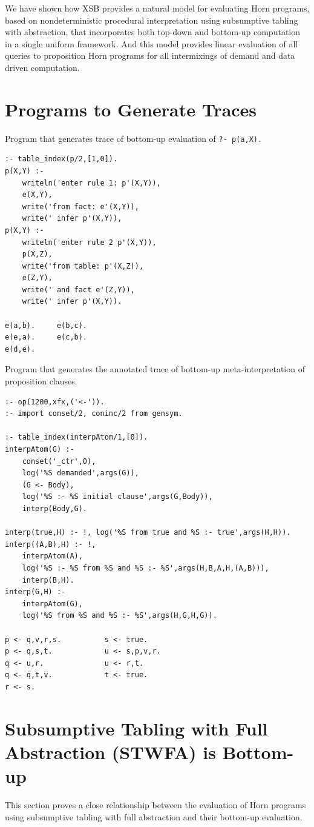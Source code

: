 We have shown how XSB provides a natural model for evaluating Horn
programs, based on nondeterministic procedural interpretation using
subsumptive tabling with abstraction, that incorporates both top-down
and bottom-up computation in a single uniform framework.  And this
model provides linear evaluation of all queries to proposition Horn
programs for all intermixings of demand and data driven computation.

\section{Programs to Generate Traces} \label{progs}
Program that generates trace of bottom-up evaluation of {\tt ?- p(a,X).}
\footnotesize
\begin{verbatim}
:- table_index(p/2,[1,0]).
p(X,Y) :-
    writeln('enter rule 1: p'(X,Y)),
    e(X,Y),
    write('from fact: e'(X,Y)),
    write(' infer p'(X,Y)),
p(X,Y) :-
    writeln('enter rule 2 p'(X,Y)),
    p(X,Z),
    write('from table: p'(X,Z)),
    e(Z,Y),
    write(' and fact e'(Z,Y)),
    write(' infer p'(X,Y)).            

e(a,b).     e(b,c).
e(e,a).     e(c,b).
e(d,e).
\end{verbatim}
\normalsize

Program that generates the annotated trace of bottom-up
meta-interpretation of proposition clauses.
\footnotesize
\begin{verbatim}
:- op(1200,xfx,('<-')).
:- import conset/2, coninc/2 from gensym.

:- table_index(interpAtom/1,[0]).
interpAtom(G) :-
    conset('_ctr',0),
    log('%S demanded',args(G)),
    (G <- Body),
    log('%S :- %S initial clause',args(G,Body)),
    interp(Body,G).

interp(true,H) :- !, log('%S from true and %S :- true',args(H,H)).
interp((A,B),H) :- !,
    interpAtom(A),
    log('%S :- %S from %S and %S :- %S',args(H,B,A,H,(A,B))),
    interp(B,H).
interp(G,H) :-
    interpAtom(G),
    log('%S from %S and %S :- %S',args(H,G,H,G)).

p <- q,v,r,s.          s <- true.
p <- q,s,t.            u <- s,p,v,r.
q <- u,r.              u <- r,t.
q <- q,t,v.            t <- true.
r <- s.
\end{verbatim}
\normalsize

\section{Subsumptive Tabling with Full Abstraction (STWFA) is Bottom-up}
\label{app-proof}
This section proves a close relationship between the evaluation of
Horn programs using subsumptive tabling with full abstraction and
their bottom-up evaluation.

